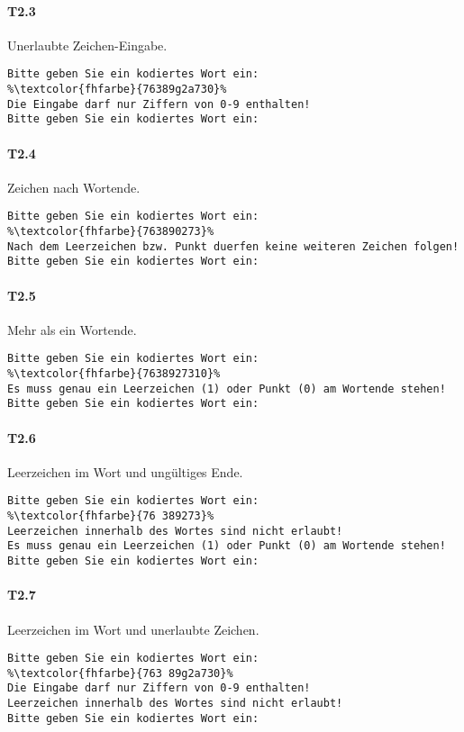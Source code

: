 \paragraph*{T2.3} Unerlaubte Zeichen-Eingabe.
\begin{lstlisting}[escapechar=\%]
Bitte geben Sie ein kodiertes Wort ein:
%\textcolor{fhfarbe}{76389g2a730}%
Die Eingabe darf nur Ziffern von 0-9 enthalten!
Bitte geben Sie ein kodiertes Wort ein:
\end{lstlisting}

\paragraph*{T2.4} Zeichen nach Wortende.
\begin{lstlisting}[escapechar=\%]
Bitte geben Sie ein kodiertes Wort ein:
%\textcolor{fhfarbe}{763890273}%
Nach dem Leerzeichen bzw. Punkt duerfen keine weiteren Zeichen folgen!
Bitte geben Sie ein kodiertes Wort ein:
\end{lstlisting}

\paragraph*{T2.5} Mehr als ein Wortende.
\begin{lstlisting}[escapechar=\%]
Bitte geben Sie ein kodiertes Wort ein:
%\textcolor{fhfarbe}{7638927310}%
Es muss genau ein Leerzeichen (1) oder Punkt (0) am Wortende stehen!
Bitte geben Sie ein kodiertes Wort ein:
\end{lstlisting}

\paragraph*{T2.6} Leerzeichen im Wort und ungültiges Ende.
\begin{lstlisting}[escapechar=\%]
Bitte geben Sie ein kodiertes Wort ein:
%\textcolor{fhfarbe}{76 389273}%
Leerzeichen innerhalb des Wortes sind nicht erlaubt!
Es muss genau ein Leerzeichen (1) oder Punkt (0) am Wortende stehen!
Bitte geben Sie ein kodiertes Wort ein:
\end{lstlisting}

\paragraph*{T2.7} Leerzeichen im Wort und unerlaubte Zeichen.
\begin{lstlisting}[escapechar=\%]
Bitte geben Sie ein kodiertes Wort ein:
%\textcolor{fhfarbe}{763 89g2a730}%
Die Eingabe darf nur Ziffern von 0-9 enthalten!
Leerzeichen innerhalb des Wortes sind nicht erlaubt!
Bitte geben Sie ein kodiertes Wort ein:
\end{lstlisting}

